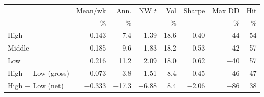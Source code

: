 \begin{tabular}{lrrrrrrr}
\toprule
 & Mean/wk & Ann. & NW $t$ & Vol & Sharpe & Max DD & Hit \\
 & \% & \% & & \% & & \% & \% \\
\midrule
High & 0.143 & 7.4 & 1.39 & 18.6 & 0.40 & $-$44 & 54 \\
Middle & 0.185 & 9.6 & 1.83 & 18.2 & 0.53 & $-$42 & 57 \\
Low & 0.216 & 11.2 & 2.09 & 18.0 & 0.62 & $-$40 & 57 \\
\midrule
High $-$ Low (gross) & $-$0.073 & $-$3.8 & $-$1.51 & 8.4 & $-$0.45 & $-$46 & 47 \\
High $-$ Low (net) & $-$0.333 & $-$17.3 & $-$6.88 & 8.4 & $-$2.06 & $-$86 & 38 \\
\bottomrule
\end{tabular}